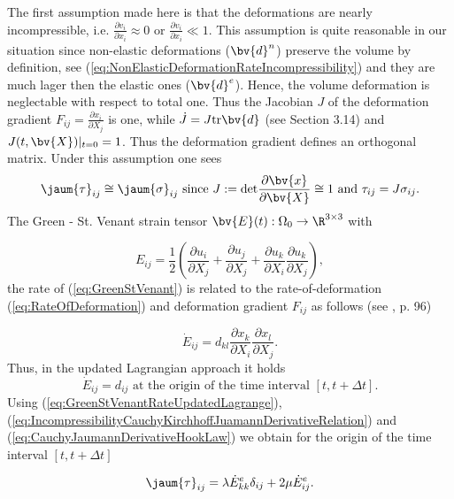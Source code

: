 The first assumption made here is that the deformations are nearly incompressible, i.e. $\frac{\partial v_i}{\partial x_i} \approx 0$ or $\frac{\partial v_i}{\partial x_i} \ll 1$. This assumption is quite reasonable in our situation since non-elastic deformations ($\bv{d}^{n}$) preserve the volume by definition, see (\ref{eq:NonElasticDeformationRateIncompressibility}) and they are  much lager then the elastic ones ($\bv{d}^{e}$). Hence, the volume deformation is neglectable with respect to total one. Thus  the Jacobian $J$ of the deformation gradient $F_{ij}=\frac{\partial x_i}{\partial X_j}$ is one, while  $\dot{J}=J\text{tr}\bv{d}$ (see \cite{BoWo97} Section 3.14) and $J(t,\bv{X})|_{t=0}=1$. Thus the deformation gradient defines an  orthogonal matrix.  Under this assumption one sees
\begin{equation}\label{eq:IncompressibilityCauchyKirchhoffJuamannDerivativeRelation}
\jaum{\tau}_{ij}\cong \jaum{\sigma}_{ij} \mbox{ since } J:=\mbox{det} \frac{\partial \bv{x}}{\partial \bv{X}}\cong  1 \mbox{ and } \tau_{ij}=J \sigma_{ij}.
\end{equation}
The Green - St. Venant strain tensor $\bv{E}(t):\Omega_0\rightarrow\R^{3\times 3}$ with

\begin{equation}\label{eq:GreenStVenant}
E_{ij}=\frac{1}{2}\left(\frac{\partial u_i}{\partial X_j}+\frac{\partial u_j}{\partial X_j}+\frac{\partial u_k}{\partial X_i}\frac{\partial u_k}{\partial X_j}\right),
\end{equation}
the rate of (\ref{eq:GreenStVenant}) is related to the rate-of-deformation (\ref{eq:RateOfDeformation}) and deformation gradient $F_{ij}$ as follows (see \cite{Belytschko2000}, p. 96)

\begin{equation}\label{eq:GreenStVenantRate}
\dot{E}_{ij}=d_{kl}\frac{\partial x_k}{\partial X_i}\frac{\partial x_l}{\partial X_j}.
\end{equation}
Thus, in the updated Lagrangian approach it holds
\begin{equation}\label{eq:GreenStVenantRateUpdatedLagrange}
\dot{E}_{ij}=d_{ij} \mbox{ at the origin of the time interval } [t,t+\Delta t].
\end{equation}
Using (\ref{eq:GreenStVenantRateUpdatedLagrange}),  (\ref{eq:IncompressibilityCauchyKirchhoffJuamannDerivativeRelation}) and  (\ref{eq:CauchyJaumannDerivativeHookLaw}) we obtain for the origin of the time interval $[t,t+\Delta t]$

\begin{equation}\label{eq:KirchhoffJaumannDerivativeHookLaw}
\jaum{\tau}_{ij}= \lambda \dot{E}^{e}_{kk} \delta_{ij}+2\mu \dot{E}^{e}_{ij}.
\end{equation}
\newpage
